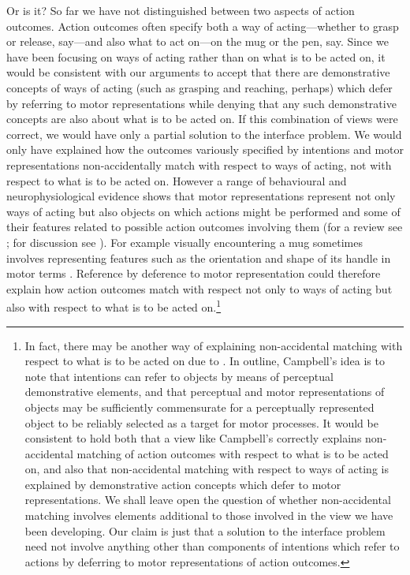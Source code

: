 \documentclass[12pt,\papersize]{extarticle}
\begin{document}
Or is it? So far we have not distinguished between two aspects of action outcomes.  Action outcomes often specify both a way of acting---whether to grasp or release, say---and also what to act on---on the mug or the pen, say.  Since we have been focusing on ways of acting rather than on what is to be acted on, it would be consistent with our arguments to accept that there are demonstrative concepts of ways of acting (such as grasping and reaching, perhaps) which defer by referring to motor representations while denying that any such demonstrative concepts are also about what is to be acted on. If this combination of views were correct, we would have only a partial solution to the interface problem. We would only have explained how the outcomes variously specified by intentions and motor representations non-accidentally match with respect to ways of acting, not with respect to what is to be acted on. However a range of behavioural and neurophysiological evidence shows that motor representations represent not only ways of acting but also objects on which actions might be performed and some of their features related to possible action outcomes involving them (for a review see \citealp{Gallese:2011uq}; for discussion see \citealp[pp.\ 410-3]{pacherie:2000_content}). For example visually encountering a mug sometimes involves representing features such as the orientation and shape of its handle in motor terms \citep{buccino:2009_broken,costantini:2010_where,cardellicchio:2011_space,Tucker:1998,tucker:2001_potentiation}. Reference by deference to motor representation could therefore explain how action outcomes match with respect not only to ways of acting but also with respect to what is to be acted on.\footnote{ In fact, there may be another way of explaining non-accidental matching with respect to what is to be acted on due to \citet[pp.\ 36-8, 44-5, 48-57]{Campbell:2002ge}. In outline, Campbell's idea is to note that intentions can refer to objects by means of perceptual demonstrative elements, and that perceptual and motor representations of objects may be sufficiently commensurate for a perceptually represented object to be reliably selected as a target for motor processes.  It would be consistent to hold both that a view like Campbell's correctly explains non-accidental matching of action outcomes with respect to what is to be acted on, and also that non-accidental matching with respect to ways of acting is explained by demonstrative action concepts which defer to motor representations. We shall leave open the question of whether non-accidental matching involves elements additional to those involved in the view we have been developing.  Our claim is just that a solution to the interface problem need not involve anything other than components of intentions which refer to actions by deferring to motor representations of action outcomes.}
\end{document}
